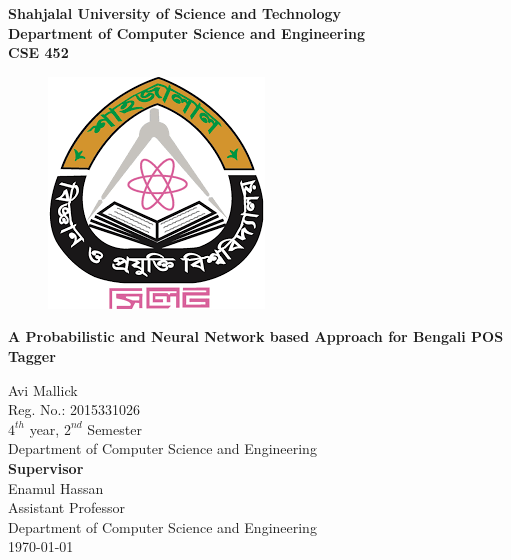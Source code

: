 \documentclass{standalone}
\begin{document}
\begin{titlepage}

\begin{center}
				{\huge \bf Shahjalal University of Science and Technology}\\
				{\LARGE \bf Department of Computer Science and Engineering}
                \\
                \vspace{15pt}
                {\LARGE \bf CSE 452}
				\vfill
        \begin{figure}[h]
				\centering
				\includegraphics[scale=0.6]{./img/varsityLogo}
				\end{figure}

				\vfill
				{\LARGE \bf A Probabilistic and Neural Network based Approach for Bengali POS Tagger}\\
				\vspace{2cm}
        
        
       Avi Mallick\\
        Reg. No.: 2015331026 \\ $4^{th}$ year, $2^{nd}$ Semester\\			
                
				
				Department of Computer Science and Engineering\\
				\vfill
        {\bf Supervisor}\\
				Enamul Hassan \\
				Assistant Professor\\
				Department of Computer Science and Engineering\\
               
        \vfill
        \today
        

\end{center}
\end{titlepage}
\end{document}
